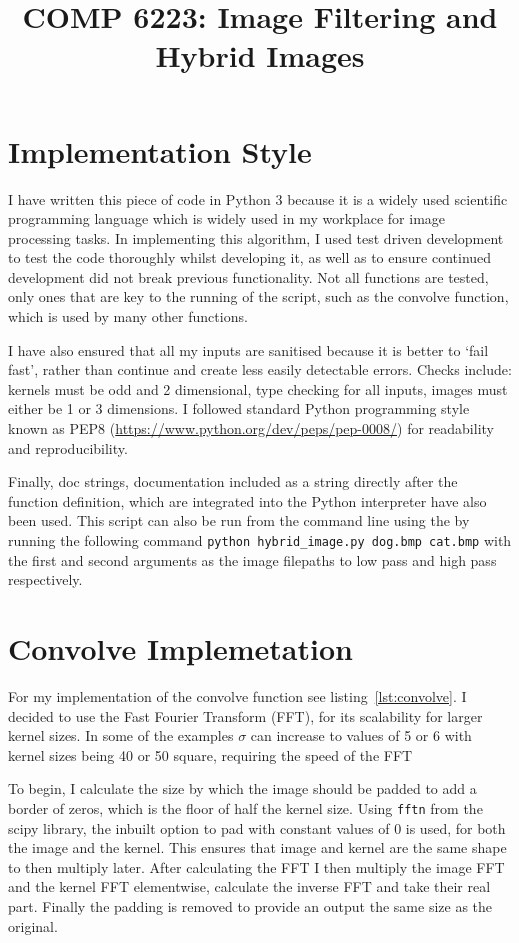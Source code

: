 \documentclass[a4paper,10pt]{article}
\title{COMP 6223: Image Filtering and Hybrid Images}
\date{}
\author{}
\begin{document}
\maketitle
\thispagestyle{fancy}

\section{Implementation Style}
I have written this piece of code in Python 3 because it is a widely used
scientific programming language which is widely used in my workplace for image processing
tasks. In implementing this algorithm, I used test driven development to test the code
thoroughly whilst developing it, as well as to ensure continued development did
not break previous functionality. Not all functions are tested, only ones that
are key to the running of the script, such as the convolve function, which is
used by many other functions.

I have also ensured that all my inputs are sanitised because it is better to
`fail fast', rather than continue and create less easily detectable errors.
Checks include: kernels must be odd and 2 dimensional, type checking for all
inputs, images must either be 1 or 3 dimensions. I followed standard Python
programming style known as PEP8 (\url{https://www.python.org/dev/peps/pep-0008/})
for readability and reproducibility.

Finally, doc strings, documentation included as a string directly after the
function definition, which are
integrated into the Python interpreter have also been used. This
script can also be run from the command line using the by running the following
command \lstinline|python hybrid_image.py dog.bmp cat.bmp| with the
first and second arguments as the image filepaths to low pass and high pass respectively.

\section{Convolve Implemetation}
For my implementation of the convolve function see listing~\ref{lst:convolve}. I
decided to use the Fast Fourier Transform (FFT), for its scalability
for larger kernel sizes. In some of the examples $\sigma$ can increase to values
of 5 or 6 with kernel sizes being 40 or 50 square, requiring the speed of the
FFT

To begin, I calculate the size by which the image should be padded to add a
border of zeros, which is the floor of half the kernel size. Using
\lstinline|fftn| from the scipy library, the inbuilt option to pad with constant
values of 0 is used, for both the image and the kernel. This ensures that
image and kernel are the same shape to then multiply later. After
calculating the FFT I then multiply the image FFT and the kernel FFT
elementwise, calculate the inverse FFT and take their real part. Finally the
padding is removed to provide an output the same size as the original.
\end{document}
